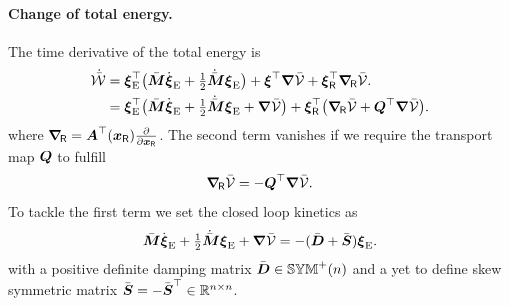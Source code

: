 \paragraph{Change of total energy.}
The time derivative of the total energy is
\begin{align}
 \dot{\bar{\mathcal{W}}} &= \boldsymbol{\xi}_{\mathrm{E}}^\top \big( \bar{\boldsymbol{M}} \dot{\boldsymbol{\xi}}_{\mathrm{E}} + \tfrac{1}{2}\dot{\bar{\boldsymbol{M}}} \boldsymbol{\xi}_{\mathrm{E}} \big) + \boldsymbol{\xi}^\top \boldsymbol{\nabla}\bar{\mathcal{V}} + \boldsymbol{\xi}_{\mathsf{R}}^\top \boldsymbol{\nabla}_{\hspace{-.3ex}\mathsf{R}}\bar{\mathcal{V}}.
\nonumber\\
\label{eq:CtrlApprochEnergyBalanceOfEnergyFirst}
 &= \boldsymbol{\xi}_{\mathrm{E}}^\top \big( \bar{\boldsymbol{M}} \dot{\boldsymbol{\xi}}_{\mathrm{E}} + \tfrac{1}{2}\dot{\bar{\boldsymbol{M}}} \boldsymbol{\xi}_{\mathrm{E}} + \boldsymbol{\nabla}\bar{\mathcal{V}} \big) + \boldsymbol{\xi}_{\mathsf{R}}^\top \big( \boldsymbol{\nabla}_{\hspace{-.3ex}\mathsf{R}}\bar{\mathcal{V}} + \boldsymbol{Q}^\top \boldsymbol{\nabla}\bar{\mathcal{V}} \big).
\end{align}
where $\boldsymbol{\nabla}_{\hspace{-.3ex}\mathsf{R}} = \boldsymbol{A}^\top(\boldsymbol{x}_{\mathsf{R}}) \tfrac{\partial }{\partial \boldsymbol{x}_{\mathsf{R}}}$.
The second term vanishes if we require the transport map $\boldsymbol{Q}$ to fulfill 
\begin{align}\label{eq:ReqTransportMap}
 \boldsymbol{\nabla}_{\hspace{-.3ex}\mathsf{R}}\bar{\mathcal{V}} = -\boldsymbol{Q}^\top \boldsymbol{\nabla}\bar{\mathcal{V}}
 .
\end{align}
To tackle the first term we set the closed loop kinetics as
\begin{align}\label{eq:CtrlApprochEnergyKineticsFirst}
 \bar{\boldsymbol{M}} \dot{\boldsymbol{\xi}}_{\mathrm{E}} + \tfrac{1}{2}\dot{\bar{\boldsymbol{M}}} \boldsymbol{\xi}_{\mathrm{E}} + \boldsymbol{\nabla}\bar{\mathcal{V}} = -(\bar{\boldsymbol{D}} + \bar{\boldsymbol{S}})\boldsymbol{\xi}_{\mathrm{E}}.
\end{align}
with a positive definite damping matrix $\bar{\boldsymbol{D}} \in \mathbb{SYM}^{+}(n)$ and a yet to define skew symmetric matrix $\bar{\boldsymbol{S}} = -\bar{\boldsymbol{S}}^\top \in \mathbb{R}^{n\times n}$.

